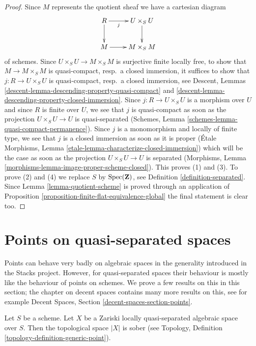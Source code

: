 \begin{proof}
Since $M$ represents the quotient sheaf we have a cartesian diagram
$$
\xymatrix{
R \ar[r]_-j \ar[d] & U \times_S U \ar[d] \\
M \ar[r] & M \times_S M
}
$$
of schemes. Since $U \times_S U \to M \times_S M$ is surjective finite locally
free, to show that $M \to M \times_S M$ is quasi-compact, resp.\ a closed
immersion, it suffices to show that $j : R \to U \times_S U$ is
quasi-compact, resp.\ a closed immersion, see
Descent, Lemmas \ref{descent-lemma-descending-property-quasi-compact} and
\ref{descent-lemma-descending-property-closed-immersion}.
Since $j : R \to U \times_S U$ is a morphism over $U$ and since
$R$ is finite over $U$, we see that $j$ is quasi-compact as soon
as the projection $U \times_S U \to U$ is quasi-separated
(Schemes, Lemma \ref{schemes-lemma-quasi-compact-permanence}).
Since $j$ is a monomorphism and locally of finite type, we see that
$j$ is a closed immersion as soon as it is proper
(\'Etale Morphisms, Lemma \ref{etale-lemma-characterize-closed-immersion})
which will be the case as soon as the projection
$U \times_S U \to U$ is separated
(Morphisms, Lemma \ref{morphisms-lemma-image-proper-scheme-closed}).
This proves (1) and (3). To prove (2) and (4) we replace $S$ by
$\mathop{\mathrm{Spec}}(\mathbf{Z})$, see Definition \ref{definition-separated}.
Since Lemma \ref{lemma-quotient-scheme} is proved through an application of
Proposition \ref{proposition-finite-flat-equivalence-global}
the final statement is clear too.
\end{proof}




\section{Points on quasi-separated spaces}
\label{section-points-quasi-separated}

\noindent
Points can behave very badly on algebraic spaces in the generality introduced
in the Stacks project. However, for quasi-separated spaces their behaviour
is mostly like the behaviour of points on schemes. We prove a few results
on this in this section; the chapter on decent spaces contains many more
results on this, see for example
Decent Spaces, Section \ref{decent-spaces-section-points}.

\begin{lemma}
\label{lemma-quasi-separated-sober}
Let $S$ be a scheme. Let $X$ be a Zariski locally quasi-separated
algebraic space over $S$. Then the topological space $|X|$ is sober (see
Topology, Definition \ref{topology-definition-generic-point}).
\end{lemma}


